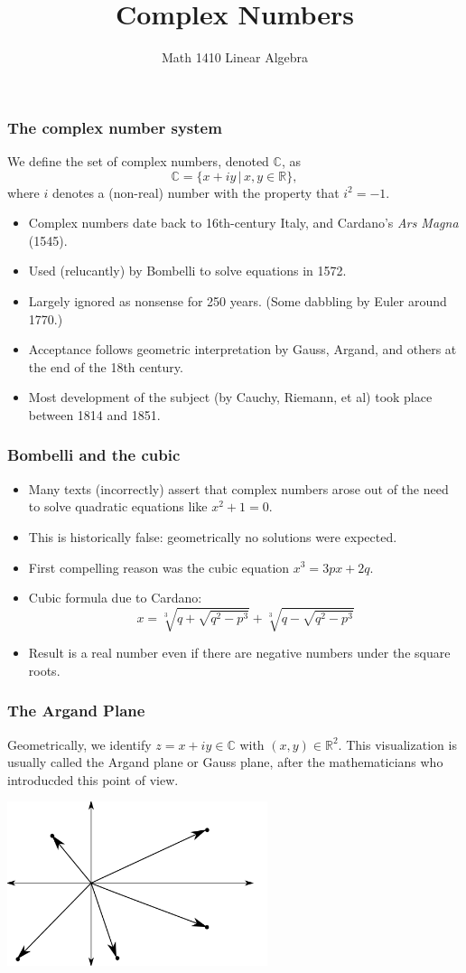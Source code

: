 \documentclass[11pt,t]{beamer}
\date{}
\author{Math 1410 Linear Algebra}
\title{Complex Numbers}
\newcommand{\R}{\mathbb{R}}
\newcommand{\C}{\mathbb{C}}
\begin{document}
\begin{frame}
\titlepage
\end{frame}


\begin{frame}\frametitle{The complex number system}
We define the set of \alert{complex numbers}, denoted $\C$, as
\[
 \C = \{x+iy\,|\, x,y\in\R\},
\]
where $i$ denotes a (non-real) number with the property that $i^2=-1$.

\begin{itemize}
 \item Complex numbers date back to 16th-century Italy, and Cardano's {\em Ars Magna} (1545).
 \item Used (relucantly) by Bombelli to solve equations in 1572.
 \item Largely ignored as nonsense for 250 years. (Some dabbling by Euler around 1770.)
 \item Acceptance follows geometric interpretation by Gauss, Argand, and others at the end of the 18th century.
 \item Most development of the subject (by Cauchy, Riemann, et al) took place between 1814 and 1851.
\end{itemize} 
\end{frame}
\begin{frame}\frametitle{Bombelli and the cubic}
\begin{itemize}
 \item Many texts (incorrectly) assert that complex numbers arose out of the need to solve quadratic equations like $x^2+1=0$.
 \item This is historically false: geometrically no solutions were expected.
 \item First compelling reason was the \alert{cubic} equation $x^3=3px+2q$.
 \item Cubic formula due to Cardano:
\[
 x = \sqrt[3]{q+\sqrt{q^2-p^3}}+\sqrt[3]{q-\sqrt{q^2-p^3}}
\]
 \item Result is a real number even if there are negative numbers under the square roots.
\end{itemize}

\end{frame}
\begin{frame}\frametitle{The Argand Plane}
 Geometrically, we identify $z=x+iy\in \C$ with $(x,y)\in\R^2$. This visualization is usually called the \alert{Argand plane} or \alert{Gauss plane}, after the mathematicians who introducded this point of view.
\begin{center}
 \includegraphics[width=3in]{argand2.pdf}
\end{center}
\end{frame}
\end{document}
